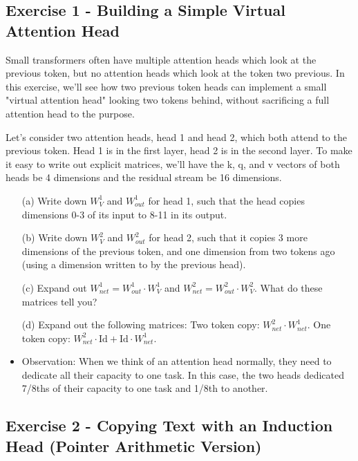 \documentclass[11pt]{article}
\begin{document}
\subsection*{Exercise 1 - Building a Simple Virtual Attention Head}

Small transformers often have multiple attention heads which look at the previous token, but no attention heads which look at the token two previous. In this exercise, we'll see how two previous token heads can implement a small "virtual attention head" looking two tokens behind, without sacrificing a full attention head to the purpose.

Let's consider two attention heads, head 1 and head 2, which both attend to the previous token. Head 1 is in the first layer, head 2 is in the second layer. To make it easy to write out explicit matrices, we'll have the k, q, and v vectors of both heads be 4 dimensions and the residual stream be 16 dimensions.

\begin{itemize}
    \item[(a)] Write down $W_V^1$ and $W_{out}^1$ for head 1, such that the head copies dimensions 0-3 of its input to 8-11 in its output.

    \item[(b)] Write down $W_V^2$ and $W_{out}^2$ for head 2, such that it copies 3 more dimensions of the previous token, and one dimension from two tokens ago (using a dimension written to by the previous head).

    \item[(c)] Expand out $W_{net}^1 = W_{out}^1 \cdot W_V^1$ and $W_{net}^2 = W_{out}^2 \cdot W_V^2$. What do these matrices tell you?

    \item[(d)] Expand out the following matrices: Two token copy: $W_{net}^2 \cdot W_{net}^1$. One token copy: $W_{net}^2 \cdot \text{Id} + \text{Id} \cdot W_{net}^1$.

    \item Observation: When we think of an attention head normally, they need to dedicate all their capacity to one task. In this case, the two heads dedicated 7/8ths of their capacity to one task and 1/8th to another.
\end{itemize}



\subsection*{Exercise 2 - Copying Text with an Induction Head (Pointer Arithmetic Version)}
\end{document}
